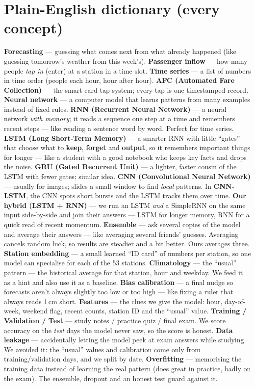 \documentclass[11pt]{article}
\newcommand{\term}[1]{\noindent\textbf{\color{ink}#1} --- }
\begin{document}
\section{Plain-English dictionary (every concept)}
\term{Forecasting} guessing what comes next from what already happened (like guessing tomorrow's
weather from this week's).
\term{Passenger inflow} how many people \emph{tap in} (enter) at a station in a time slot.
\term{Time series} a list of numbers in time order (people each hour, hour after hour).
\term{AFC (Automated Fare Collection)} the smart-card tap system; every tap is one timestamped record.
\term{Neural network} a computer model that learns patterns from many examples instead of fixed rules.
\term{RNN (Recurrent Neural Network)} a neural network \emph{with memory}; it reads a sequence one
step at a time and remembers recent steps --- like reading a sentence word by word. Perfect for time series.
\term{LSTM (Long Short-Term Memory)} a smarter RNN with little ``gates'' that choose what to
\textbf{keep}, \textbf{forget} and \textbf{output}, so it remembers important things for longer ---
like a student with a good notebook who keeps key facts and drops the noise.
\term{GRU (Gated Recurrent Unit)} a lighter, faster cousin of the LSTM with fewer gates; similar idea.
\term{CNN (Convolutional Neural Network)} usually for images; slides a small window to find \emph{local}
patterns. In \textbf{CNN-LSTM}, the CNN spots short bursts and the LSTM tracks them over time.
\term{Our hybrid (LSTM + RNN)} we run an LSTM \emph{and} a SimpleRNN on the same input side-by-side and
join their answers --- LSTM for longer memory, RNN for a quick read of recent momentum.
\term{Ensemble} ask several copies of the model and average their answers --- like averaging several
friends' guesses. Averaging cancels random luck, so results are steadier and a bit better. Ours
averages three.
\term{Station embedding} a small learned ``ID card'' of numbers per station, so one model can
specialise for each of the 53 stations.
\term{Climatology} the ``usual'' pattern --- the historical average for that station, hour and
weekday. We feed it as a hint and also use it as a baseline.
\term{Bias calibration} a final nudge so forecasts aren't always slightly too low or too high ---
like fixing a ruler that always reads 1\,cm short.
\term{Features} the clues we give the model: hour, day-of-week, weekend flag, recent counts, station
ID and the ``usual'' value.
\term{Training / Validation / Test} study notes / practice quiz / final exam. We score accuracy on
the \emph{test} days the model never saw, so the score is honest.
\term{Data leakage} accidentally letting the model peek at exam answers while studying. We avoided it:
the ``usual'' values and calibration come only from training/validation days, and we split by date.
\term{Overfitting} memorising the training data instead of learning the real pattern (does great in
practice, badly on the exam). The ensemble, dropout and an honest test guard against it.
\end{document}
